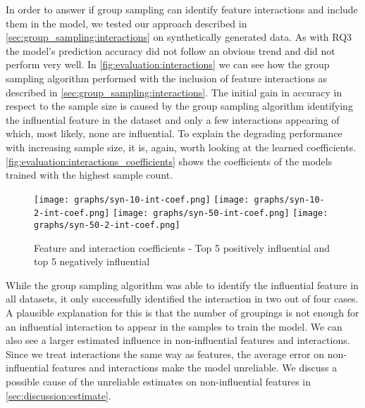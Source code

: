 \documentclass[../thesis.tex]{subfiles}
\begin{document}
In order to answer if group sampling can identify feature interactions and include them in the model, 
we tested our approach described in \autoref{sec:group_sampling:interactions} on synthetically generated data.
As with RQ3 the model's prediction accuracy did not follow an obvious trend and did not perform very well.
In \autoref{fig:evaluation:interactions} we can see how the group sampling algorithm performed with the inclusion
of feature interactions as described in \autoref{sec:group_sampling:interactions}. 
The initial gain in accuracy in respect to the sample size is caused by the group sampling algorithm identifying 
the influential feature in the dataset and only a few interactions appearing of which, most likely, none are influential.
To explain the degrading performance with increasing sample size, it is, again, worth looking at the learned coefficients.
\autoref{fig:evaluation:interactions_coefficients} shows the coefficients of the models trained with the highest sample count. 

\begin{figure}[!h]
      \texttt{[image: graphs/syn-10-int-coef.png]}
      \texttt{[image: graphs/syn-10-2-int-coef.png]}
      \texttt{[image: graphs/syn-50-int-coef.png]}
      \texttt{[image: graphs/syn-50-2-int-coef.png]}
      \caption[Model coefficients - interactions on synthetic data]{
            Feature and interaction coefficients - Top 5 positively influential and top 5 negatively influential
      }\label{fig:evaluation:interactions_coefficients}
\end{figure}


While the group sampling algorithm was able to identify the influential feature in all datasets, it only
successfully identified the interaction in two out of four cases. A plausible explanation for this is that
the number of groupings is not enough for an influential interaction to appear in the samples to train the model.
We can also see a larger estimated influence in non-influential features and interactions. 
Since we treat interactions the same way as features, the average error on non-influential features and 
interactions make the model unreliable. We discuss a possible cause of the unreliable estimates on
non-influential features in \autoref{sec:discussion:estimate}.  
\end{document}
